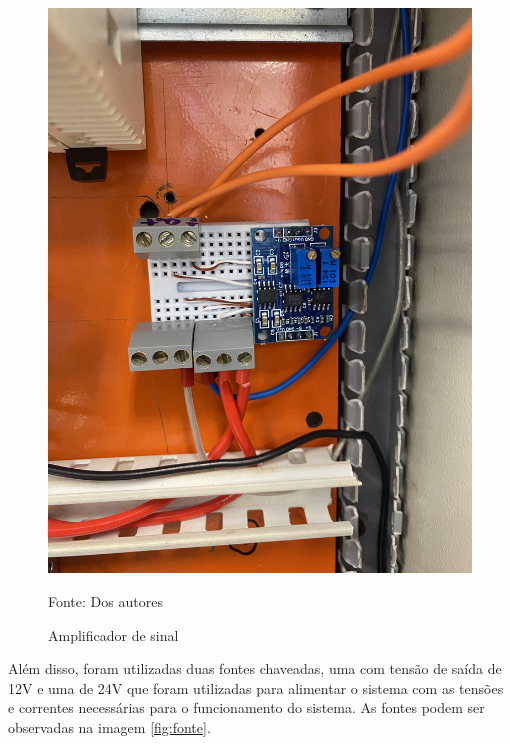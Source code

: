 \begin{figure}[H]
    \centering\footnotesize
    \caption{Amplificador de sinal}
    \begin{center}
        \includegraphics[scale=0.1]{imagens/amplificador.jpg}
    \end{center}
    \label{fig:amp}
    \par Fonte: Dos autores
\end{figure}


Além disso, foram utilizadas duas fontes chaveadas, uma com tensão de saída de 12V e uma de 24V que foram utilizadas para alimentar o sistema com as tensões e correntes necessárias para o funcionamento do sistema. As fontes podem ser observadas na imagem \ref{fig:fonte}.

